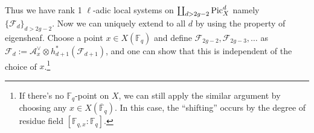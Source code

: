 Thus we have rank 1 $\ell$-adic local systems on $\coprod_{d > 2g - 2}\operatorname{\mathrm{Pic}}_{X}^{d}$ namely $\{\mathcal{F}_{d}\}_{d > 2g - 2}$.
Now we can uniquely extend to all $d$ by using the property of eigensheaf.
Choose a point $x \in X(\mathbb{F}_{q})$ and define $\mathcal{F}_{2g-2}, \mathcal{F}_{2g-3}, \dots$ as $\mathcal{F}_{d} := \mathcal{A}_{x}^{\vee} \otimes h_{d+1}^{*}(\mathcal{F}_{d+1})$, 
and one can show that this is independent of the choice of $x$.\footnote{
    If there's no $\mathbb{F}_{q}$-point on $X$, we can still apply the similar argument by choosing any $x \in X(\overline{\mathbb{F}}_{q})$.
    In this case, the ``shifting'' occurs by the degree of residue field $[\mathbb{F}_{q, x}: \mathbb{F}_{q}]$.
}